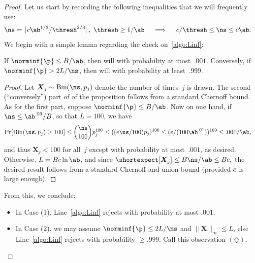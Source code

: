 \documentclass[11pt]{article}
\newcommand{\E}{\shortexpect}
\newcommand{\bX}{\boldsymbol{X}}
\begin{document}
\begin{proof}
	Let us start by recording the following inequalities that we will frequently use: 
	\begin{equation}	\label{ineq:nbd}
		\ns =  \lceil \cc \ab^{1/3}/\thresh^{2/3}\rceil,\ \thresh \geq 1/\ab \quad\implies\quad \cc/\thresh \leq \ns \leq \cc\ab.
	\end{equation}
	We begin with a simple lemma regarding the check on~\cref{algo:Linf}:
	\begin{lemma} \label{prop:line3}
	If $\norminf{\p} \leq B/\ab$, then  will \reject with probability at most~$.001$.
	Conversely, if $\norminf{\p} > 2L/\ns$, then  will \reject with probability at least~$.999$.
\end{lemma}
\begin{proof}
	Let $\bX_j \sim \text{Bin}(\ns,p_j)$ denote the number of times~$j$ is drawn.
	The second (``conversely'') part of of the proposition follows from a standard Chernoff bound. %
	As for the first part, suppose $\norminf{\p} \leq B/\ab$.
	Now on one hand, if $\ns \leq \ab^{.99}/B$, so that $L = 100$, we have
	\begin{equation}
		\Pr[\text{Bin}(\ns,p_j) \geq 100] \leq \binom{\ns}{100} p_j^{100} \leq ((e\ns/100)p_j)^{100} \leq (e/(100\ab^{.01}))^{100} \leq .001/\ab,
	\end{equation}
	and thus $\bX_j < 100$ for all~$j$ except with probability at most~$.001$, as desired.
	Otherwise, $L = B\cc \ln \ab$, and since $
		\E[\bX_j] \leq B\ns/\ab \leq B\cc,
	$
	the desired result follows from a standard Chernoff and union bound (provided $c$ is large enough).
\end{proof}
	\noindent From this, we conclude:
	\begin{itemize}
		\item In Case (1), Line~\ref{algo:Linf} rejects with probability at most $.001$.
		\item In Case (2), we may assume $\norminf{\p}\leq 2L/\ns$ and $\|\bX\|_\infty \leq L$, else Line~\ref{algo:Linf} rejects with probability $\geq .999$. Call this observation $(\diamondsuit)$.
	\end{itemize}


\end{proof}
\end{document}
